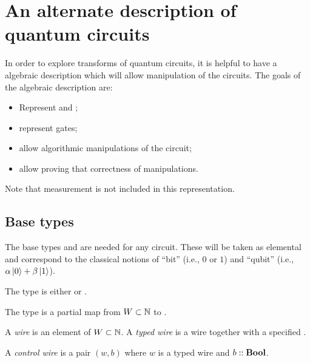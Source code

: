 




\section{An alternate description of quantum circuits} %
\label{sec:an_alternate_description_of_quantum_circuits}

In order to explore transforms of quantum circuits, it is helpful to have a algebraic description
which will allow manipulation of the circuits. The goals of the algebraic description are:
\begin{itemize}
  \item Represent \qubits and \bits;
  \item represent gates;
  \item allow algorithmic manipulations of the circuit;
  \item allow proving that correctness of manipulations.
\end{itemize}

Note that measurement is not included in this representation.

\subsection{Base types} %
\label{sub:base_types}
The base types \bit and \qubit are needed for any circuit. These will be taken as elemental and
correspond to the classical notions of ``bit'' (i.e., $0$ or $1$) and ``qubit'' (i.e.,
$\alpha\left\vert{0}\right\rangle + \beta\left\vert{1}\right\rangle$).
\begin{definition}\label{def:endpoint}
  The type  is either \bit or \qubit.
\end{definition}

\begin{definition}\label{def:qarity}
  The type  is a partial map from $W\subset\mathbb{N}$ to .
\end{definition}

\begin{definition}\label{def:wire}
  A \emph{wire} is an element of $W\subset\mathbb{N}$. A \emph{typed wire} is a wire together with a
  specified .
\end{definition}

\begin{definition}\label{def:control}
  A \emph{control wire} is a pair $(w,b)$ where $w$ is a typed wire and $b::\mathbf{{Bool}}$.
\end{definition}

